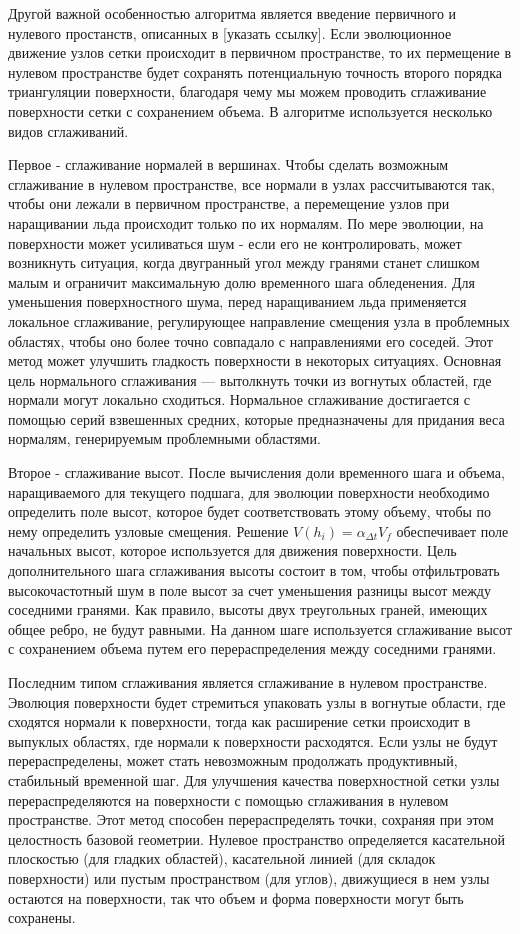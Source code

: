 Другой важной особенностью алгоритма является введение первичного и нулевого простанств, описанных в [указать ссылку]. Если эволюционное движение узлов сетки происходит в первичном пространстве, то их пермещение в нулевом пространстве будет сохранять потенциальную точность второго порядка триангуляции поверхности, благодаря чему мы можем  проводить сглаживание поверхности сетки с сохранением объема. В алгоритме используется несколько видов сглаживаний.

Первое - сглаживание нормалей в вершинах. Чтобы сделать возможным сглаживание в нулевом пространстве, все нормали в узлах рассчитываются так, чтобы они лежали в первичном пространстве, а перемещение узлов при наращивании льда происходит только по их нормалям. По мере эволюции, на поверхности может усиливаться шум - если его не контролировать, может возникнуть ситуация, когда двугранный угол между гранями станет слишком малым и ограничит максимальную долю временного шага обледенения. Для уменьшения поверхностного шума, перед наращиванием льда применяется локальное сглаживание, регулирующее направление смещения узла в проблемных областях, чтобы оно более точно совпадало с направлениями его соседей. Этот метод может улучшить гладкость поверхности в некоторых ситуациях.
 Основная цель нормального сглаживания — вытолкнуть точки из вогнутых областей, где нормали могут локально сходиться. Нормальное сглаживание достигается с помощью серий взвешенных средних, которые предназначены для придания веса нормалям, генерируемым проблемными областями.

Второе - сглаживание высот. После вычисления доли временного шага и объема, наращиваемого для текущего подшага, для эволюции поверхности необходимо определить поле высот, которое будет соответствовать этому объему, чтобы по нему определить узловые смещения. Решение $V(h_i)=\alpha_{\Delta t}V_f$ обеспечивает поле начальных высот, которое используется для движения поверхности. Цель дополнительного шага сглаживания высоты состоит в том, чтобы отфильтровать высокочастотный шум в поле высот за счет уменьшения разницы высот между соседними гранями. Как правило, высоты двух треугольных граней, имеющих общее ребро, не будут равными. На данном шаге используется сглаживание высот с сохранением объема путем его перераспределения между соседними гранями.

Последним типом сглаживания является сглаживание в нулевом пространстве. Эволюция поверхности будет стремиться упаковать узлы в вогнутые области, где сходятся нормали к поверхности, тогда как расширение сетки происходит в выпуклых областях, где нормали к поверхности расходятся. Если узлы не будут перераспределены, может стать невозможным продолжать продуктивный, стабильный временной шаг. Для улучшения качества поверхностной сетки узлы перераспределяются на поверхности с помощью сглаживания в нулевом пространстве. Этот метод способен перераспределять точки, сохраняя при этом целостность базовой геометрии. Нулевое пространство определяется касательной плоскостью (для гладких областей), касательной линией (для складок поверхности) или пустым пространством (для углов), движущиеся в нем узлы остаются на поверхности, так что объем и форма поверхности могут быть сохранены.